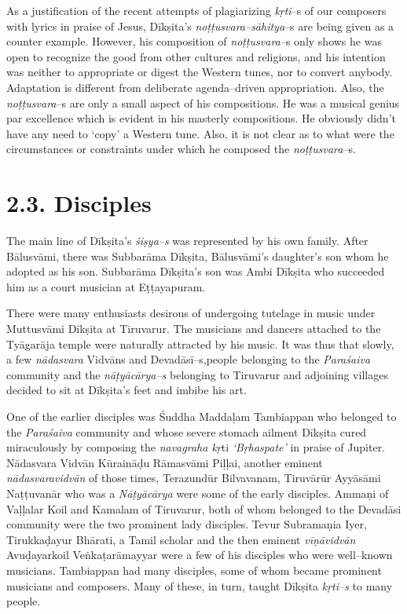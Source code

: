 As a justification of the recent attempts of plagiarizing \textit{kṛti}–s of our composers with lyrics in praise of Jesus, Dīkṣita’s \textit{noṭṭusvara–sāhitya}–s are being given as a counter example. However, his composition of \textit{noṭṭusvara–}s only shows he was open to recognize the good from other cultures and religions, and his intention was neither to appropriate or digest the Western tunes, nor to convert anybody. Adaptation is different from deliberate agenda–driven appropriation. Also, the \textit{noṭṭusvara}–s are only a small aspect of his compositions. He was a musical genius par excellence which is evident in his masterly compositions. He obviously didn’t have any need to ‘copy’ a Western tune. Also, it is not clear as to what were the circumstances or constraints under which he composed the \textit{noṭṭusvara}–s.


\section*{2.3. Disciples}

The main line of Dīkṣita’s \textit{śiṣya–s} was represented by his own family. After Bālusvāmi, there was Subbarāma Dīkṣita, Bālusvāmi’s daughter’s son whom he adopted as his son. Subbarāma Dīkṣita’s son was Ambi Dīkṣita who succeeded him as a court musician at Eṭṭayapuram.

There were many enthusiasts desirous of undergoing tutelage in music under Muttusvāmi Dīkṣita at Tiruvarur. The musicians and dancers attached to the Tyāgarāja temple were naturally attracted by his music. It was thus that slowly, a few \textit{nādasvara} Vidvāns and Devadāsī–s,\break people belonging to the \textit{Paraśaiva} community and the \textit{nāṭyācārya–s} belonging to Tiruvarur and adjoining villages decided to sit at Dīkṣita's feet and imbibe his art.

One of the earlier disciples was Śuddha Maddaḷam Tambiappan who belonged to the \textit{Paraśaiva} community and whose severe stomach ailment Dīkṣita cured miraculously by composing the \textit{navagraha kṛ}ti\textit{ ‘Bṛhaspate’} in praise of Jupiter. Nādasvara Vidvān Kūraināḍu Rāmasvāmi Piḷḷai, another eminent \textit{nādasvaravidvān} of those times, Terazundūr Bilvavanam, Tiruvārūr Ayyāsāmi Naṭṭuvanār who was a \textit{Nāṭyācārya} were some of the early disciples. Ammaṇi of Vaḷḷalar Koil and Kamalam of Tiruvarur, both of whom belonged to the Devadāsi community were the two prominent lady disciples. Tevur Subramaṇia Iyer, Tirukkaḍayur Bhārati, a Tamil scholar and the then eminent \textit{vīṇāvidvān} Avuḍayarkoil Veṅkaṭarāmayyar were a few of his disciples who were well–known musicians. Tambiappan had many disciples, some of whom became prominent musicians and composers. Many of these, in turn, taught Dīkṣita \textit{kṛti–s} to many people.

